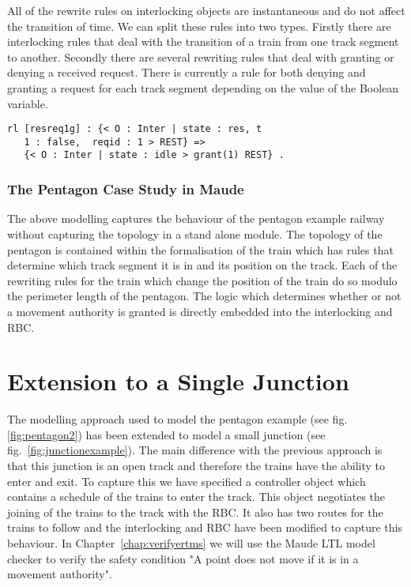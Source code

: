 All of the rewrite rules on interlocking objects are instantaneous and do not affect the transition of time.  We can split these rules into two types. Firstly there are interlocking rules that deal with the transition of a train from one track segment to another. Secondly there are several rewriting rules that deal with granting or denying a received request. There is currently a rule for both denying and granting a request for each track segment depending on the value of the Boolean variable.

\begin{lstlisting}[caption = The interlocking transition which grants a track segment request]
rl [resreq1g] : {< O : Inter | state : res, t
   1 : false,  reqid : 1 > REST} => 
   {< O : Inter | state : idle > grant(1) REST} .
\end{lstlisting}

\subsubsection*{The Pentagon Case Study in Maude}
The above modelling captures the behaviour of the pentagon example railway without capturing the topology in a stand alone module. The topology of the pentagon is contained within the formalisation of the train which has rules that determine which track segment it is in and its position on the track. Each of the rewriting rules for the train which change the position of the train do so modulo the perimeter length of the pentagon. The logic which determines whether or not a movement authority is granted is directly embedded into the interlocking and RBC.

\section{Extension to a Single Junction}
The modelling approach used to model the pentagon example (see fig. \ref{fig:pentagon2}) has been extended to model a small junction (see fig.~\ref{fig:junctionexample}). The main difference with the previous approach is that this junction is an open track and therefore the trains have the ability to enter and exit. To capture this we have specified a controller object which contains a schedule of the trains to enter the track. This object negotiates the joining of the trains to the track with the RBC. It also has two routes for the trains to follow and the interlocking and RBC have been modified to capture this behaviour.  In Chapter~\ref{chap:verifyertms} we will use the Maude LTL model checker to verify the safety condition "A point does not move if it is in a movement authority".
 
